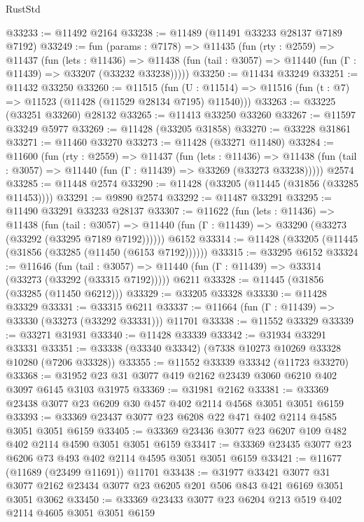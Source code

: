 \begin{lexlean}{RustStd}
\begin{coremodule}
@33233 := @11492 @2164
@33238 := @11489 (@11491 @33233 @28137 @7189 @7192)
@33249 := fun (params : @7178) =>
  @11435
    (fun (rty : @2559) =>
    @11437
      (fun (lets : @11436) =>
      @11438 (fun (tail : @3057) => @11440 (fun (Γ : @11439) => @33207 (@33232 @33238)))))
@33250 := @11434 @33249
@33251 := @11432 @33250
@33260 := @11515
    (fun (U : @11514) => @11516 (fun (t : @7) => @11523 (@11428 (@11529 @28134 @7195) @11540)))
@33263 := @33225 (@33251 @33260) @28132
@33265 := @11413 @33250 @33260
@33267 := @11597 @33249 @5977
@33269 := @11428 (@33205 @31858)
@33270 := @33228 @31861
@33271 := @11460 @33270
@33273 := @11428 (@33271 @11480)
@33284 := @11600
    (fun (rty : @2559) =>
    @11437
      (fun (lets : @11436) =>
      @11438 (fun (tail : @3057) => @11440 (fun (Γ : @11439) => @33269 (@33273 @33238)))))
    @2574
@33285 := @11448 @2574
@33290 := @11428 (@33205 (@11445 (@31856 (@33285 @11453))))
@33291 := @9890 @2574
@33292 := @11487 @33291
@33295 := @11490 @33291 @33233 @28137
@33307 := @11622
    (fun (lets : @11436) =>
    @11438
      (fun (tail : @3057) =>
      @11440 (fun (Γ : @11439) => @33290 (@33273 (@33292 (@33295 @7189 @7192))))))
    @6152
@33314 := @11428 (@33205 (@11445 (@31856 (@33285 (@11450 (@6153 @7192))))))
@33315 := @33295 @6152
@33324 := @11646
    (fun (tail : @3057) => @11440 (fun (Γ : @11439) => @33314 (@33273 (@33292 (@33315 @7192)))))
    @6211
@33328 := @11445 (@31856 (@33285 (@11450 @6212)))
@33329 := @33205 @33328
@33330 := @11428 @33329
@33331 := @33315 @6211
@33337 := @11664 (fun (Γ : @11439) => @33330 (@33273 (@33292 @33331))) @11701
@33338 := @11552 @33329
@33339 := @33271 @31931
@33340 := @11428 @33339
@33342 := @31934 @33291 @33331
@33351 := @33338 (@33340 @33342) (@7338 @10273 @10269 @33328 @10280 (@7206 @33328))
@33355 := @11552 @33339 @33342 (@11723 @33270)
@33368 := @31952 @23 @31 @3077 @419 @2162 @23439 @3060 @6210 @402 @3097 @6145 @3103 @31975
@33369 := @31981 @2162
@33381 := @33369 @23438 @3077 @23 @6209 @30 @457 @402 @2114 @4568 @3051 @3051 @6159
@33393 := @33369 @23437 @3077 @23 @6208 @22 @471 @402 @2114 @4585 @3051 @3051 @6159
@33405 := @33369 @23436 @3077 @23 @6207 @109 @482 @402 @2114 @4590 @3051 @3051 @6159
@33417 := @33369 @23435 @3077 @23 @6206 @73 @493 @402 @2114 @4595 @3051 @3051 @6159
@33421 := @11677 (@11689 (@23499 @11691)) @11701
@33438 := @31977
    @33421
    @3077
    @31
    @3077
    @2162
    @23434
    @3077
    @23
    @6205
    @201
    @506
    @843
    @421
    @6169
    @3051
    @3051
    @3062
@33450 := @33369 @23433 @3077 @23 @6204 @213 @519 @402 @2114 @4605 @3051 @3051 @6159

\end{coremodule}
\end{lexlean}
